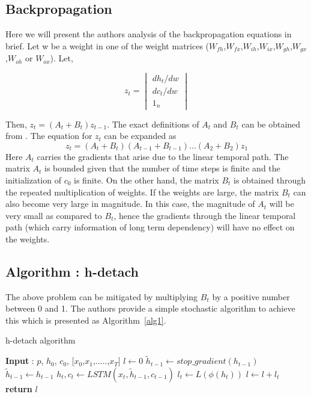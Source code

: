 \subsection{Backpropagation}
Here we will present the authors analysis of the backpropagation equations in brief. Let w be a weight in one of the weight matrices ($W_{fh}$,$W_{fx}$,$W_{ih}$,$W_{ix}$,$W_{gh}$,$W_{gx}$,$W_{oh}$ or $W_{ox}$). Let,


    \begin{equation} \label{eq7}
        z_t=\begin{vmatrix}
             dh_t/dw  \\
             dc_t/dw \\
             1_n
        \end{vmatrix}
    \end{equation}


Then, $z_t=(A_t+B_t)z_{t-1}$. The exact definitions of $A_t$ and $B_t$ can be obtained from \cite{kanuparthi2018hdetach}. The equation for $z_t$ can be expanded as 
    \begin{equation} \label{eq8}
        z_t=(A_t+B_t)(A_{t-1}+B_{t-1})...(A_2+B_2)z_1
    \end{equation}
Here $A_t$ carries the gradients that arise due to the linear temporal path. The matrix $A_t$ is bounded given that the number of time steps is finite and the initialization of $c_0$ is finite. On the other hand, the matrix $B_t$ is obtained through the repeated multiplication of weights. If the weights are large, the matrix $B_t$ can also become very large in magnitude. In this case, the magnitude of $A_t$ will be very small as compared to $B_t$, hence the gradients through the linear temporal path (which carry information of long term dependency) will have no effect on the weights.

\subsection{Algorithm : h-detach}

The above problem can be mitigated by multiplying $B_t$ by a positive number between 0 and 1. The authors provide a simple stochastic algorithm to achieve this which is presented as Algorithm~\ref{alg1}.

\begin{algorithm}
\caption{h-detach algorithm}\label{alg1}
\begin{algorithmic}[1]
\State \textbf{Input} : $p$, $h_0$, $c_0$, [$x_0$,$x_1$,.....,$x_T$]
\State $l\gets 0$
\State $\tilde{h}_{t-1}\gets stop\_gradient(h_{t-1})$
\Else
\State $\tilde{h}_{t-1}\gets h_{t-1}$
\EndIf
\State $h_t,c_t \gets LSTM(x_t,\tilde{h}_{t-1},c_{t-1})$
\State $l_t \gets L(\phi(h_t))$
\State $l \gets l + l_t$
\EndFor
\State \textbf{return} $l$

\end{algorithmic}
\end{algorithm}



